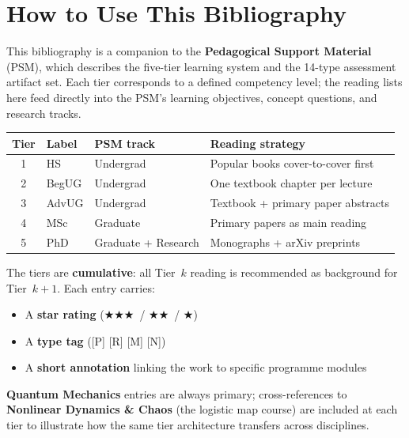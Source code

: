 \documentclass[11pt,a4paper]{article}
\newcommand{\essential}{$\bigstar\bigstar\bigstar$}
\newcommand{\recommended}{$\bigstar\bigstar$}
\newcommand{\useful}{$\bigstar$}
\begin{document}
\section*{How to Use This Bibliography}

\begin{tcolorbox}[keybox]
This bibliography is a companion to the \textbf{Pedagogical Support Material} (PSM),
which describes the five-tier learning system and the 14-type assessment artifact set.
Each tier corresponds to a defined competency level; the reading lists here feed
directly into the PSM's learning objectives, concept questions, and research tracks.
\end{tcolorbox}

\medskip
\begin{center}
\begin{tabular}{clp{3.5cm}p{5.5cm}}
\toprule
\textbf{Tier} & \textbf{Label} & \textbf{PSM track} & \textbf{Reading strategy}\\
\midrule
1 & HS       & Undergrad & Popular books cover-to-cover first\\
2 & BegUG    & Undergrad & One textbook chapter per lecture\\
3 & AdvUG    & Undergrad & Textbook + primary paper abstracts\\
4 & MSc      & Graduate  & Primary papers as main reading\\
5 & PhD      & Graduate + Research & Monographs + arXiv preprints\\
\bottomrule
\end{tabular}
\end{center}

\medskip
\noindent The tiers are \textbf{cumulative}: all Tier~$k$ reading is recommended as
background for Tier~$k{+}1$. Each entry carries:
\begin{itemize}[leftmargin=1.8em,itemsep=1pt]
  \item A \textbf{star rating} (\essential\ / \recommended\ / \useful)
  \item A \textbf{type tag} ([P] [R] [M] [N])
  \item A \textbf{short annotation} linking the work to specific programme modules
\end{itemize}

\medskip
\noindent\textbf{Quantum Mechanics} entries are always primary; cross-references to
\textbf{Nonlinear Dynamics \& Chaos} (the logistic map course) are included at each
tier to illustrate how the same tier architecture transfers across disciplines.
\end{document}
